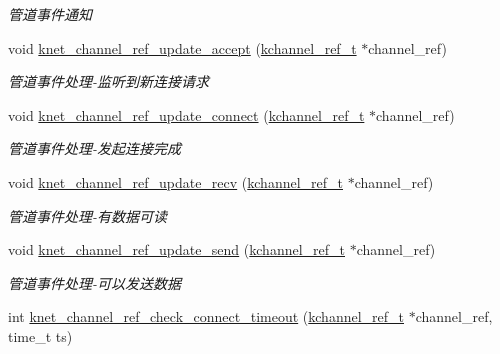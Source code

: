 \begin{DoxyCompactItemize}
\begin{DoxyCompactList}\small\item\em 管道事件通知 \end{DoxyCompactList}\item 
void \hyperlink{a00049_a39cd9444637453f7cc1b601d0d69eb5b_a39cd9444637453f7cc1b601d0d69eb5b}{knet\+\_\+channel\+\_\+ref\+\_\+update\+\_\+accept} (\hyperlink{a00051_a3b7e82599367eade261456f60ebe2cd9_a3b7e82599367eade261456f60ebe2cd9}{kchannel\+\_\+ref\+\_\+t} $\ast$channel\+\_\+ref)
\begin{DoxyCompactList}\small\item\em 管道事件处理-\/监听到新连接请求 \end{DoxyCompactList}\item 
void \hyperlink{a00049_a22a512506db436ec5a274202edcba89e_a22a512506db436ec5a274202edcba89e}{knet\+\_\+channel\+\_\+ref\+\_\+update\+\_\+connect} (\hyperlink{a00051_a3b7e82599367eade261456f60ebe2cd9_a3b7e82599367eade261456f60ebe2cd9}{kchannel\+\_\+ref\+\_\+t} $\ast$channel\+\_\+ref)
\begin{DoxyCompactList}\small\item\em 管道事件处理-\/发起连接完成 \end{DoxyCompactList}\item 
void \hyperlink{a00049_a3d90a5ee67452c8083c0f1b3712310fd_a3d90a5ee67452c8083c0f1b3712310fd}{knet\+\_\+channel\+\_\+ref\+\_\+update\+\_\+recv} (\hyperlink{a00051_a3b7e82599367eade261456f60ebe2cd9_a3b7e82599367eade261456f60ebe2cd9}{kchannel\+\_\+ref\+\_\+t} $\ast$channel\+\_\+ref)
\begin{DoxyCompactList}\small\item\em 管道事件处理-\/有数据可读 \end{DoxyCompactList}\item 
void \hyperlink{a00049_a4bdd7b15093a0b5bec991ed019bb130c_a4bdd7b15093a0b5bec991ed019bb130c}{knet\+\_\+channel\+\_\+ref\+\_\+update\+\_\+send} (\hyperlink{a00051_a3b7e82599367eade261456f60ebe2cd9_a3b7e82599367eade261456f60ebe2cd9}{kchannel\+\_\+ref\+\_\+t} $\ast$channel\+\_\+ref)
\begin{DoxyCompactList}\small\item\em 管道事件处理-\/可以发送数据 \end{DoxyCompactList}\item 
int \hyperlink{a00049_aa87f4087c20f1937dd7d75ab783e1114_aa87f4087c20f1937dd7d75ab783e1114}{knet\+\_\+channel\+\_\+ref\+\_\+check\+\_\+connect\+\_\+timeout} (\hyperlink{a00051_a3b7e82599367eade261456f60ebe2cd9_a3b7e82599367eade261456f60ebe2cd9}{kchannel\+\_\+ref\+\_\+t} $\ast$channel\+\_\+ref, time\+\_\+t ts)

\end{DoxyCompactItemize}
